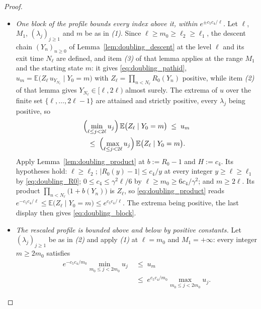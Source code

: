 \begin{proof}
\begin{itemize}
    \item \emph{One block of the profile bounds every index above it, within
    $e^{\pm c_5c_4/\ell}$.} Let $\ell$, $M_1$, $(\lambda_j)_{j\geq1}$ and $m$ be as in
    \emph{(1)}. Since $\ell\geq m_0\geq\ell_2\geq\ell_1$, the descent chain $(Y_n)_{n\geq0}$ of
    Lemma~\ref{lem:doubling_descent} at the level $\ell$ and its exit time $N_\ell$ are
    defined, and item \emph{(3)} of that lemma applies at the range $M_1$ and the starting
    state $m$: it gives \eqref{eq:doubling_pathid},
    $u_m=\mathbb E\bigl(Z_\ell\,u_{Y_{N_\ell}}\mid Y_0=m\bigr)$ with
    $Z_\ell=\prod_{n<N_\ell}R_0(Y_n)$ positive, while item \emph{(2)} of that lemma gives
    $Y_{N_\ell}\in[\ell,2\ell)$ almost surely. The extrema of $u$ over the finite set
    $\{\ell,\dots,2\ell-1\}$ are attained and strictly positive, every $\lambda_j$ being
    positive, so
    \begin{multline}
        \Bigl(\min_{\ell\leq j<2\ell}u_j\Bigr)\,\mathbb E\bigl(Z_\ell\mid Y_0=m\bigr)
        \;\leq\;u_m\\
        \;\leq\;\Bigl(\max_{\ell\leq j<2\ell}u_j\Bigr)\,
        \mathbb E\bigl(Z_\ell\mid Y_0=m\bigr).
    \end{multline}
    Apply Lemma~\ref{lem:doubling_product} at $b:=R_0-1$ and $H:=c_4$. Its hypotheses hold:
    $\ell\geq\ell_2$; $\bigl|R_0(y)-1\bigr|\leq c_4/y$ at every integer $y\geq\ell\geq\ell_1$
    by \eqref{eq:doubling_R0}; $0\leq c_4\leq\gamma^2\ell/6$ by
    $\ell\geq m_0\geq6c_4/\gamma^2$; and $m\geq2\ell$. Its product
    $\prod_{n<N_\ell}\bigl(1+b(Y_n)\bigr)$ is $Z_\ell$, so \eqref{eq:doubling_product} reads
    $e^{-c_5c_4/\ell}\leq\mathbb E\bigl(Z_\ell\mid Y_0=m\bigr)\leq e^{c_5c_4/\ell}$. The
    extrema being positive, the last display then gives \eqref{eq:doubling_block}.
    \item \emph{The rescaled profile is bounded above and below by positive constants.} Let
    $(\lambda_j)_{j\geq1}$ be as in \emph{(2)} and apply \emph{(1)} at $\ell=m_0$ and
    $M_1=+\infty$: every integer $m\geq2m_0$ satisfies
    \begin{equation}
    \begin{aligned}
        e^{-c_5c_4/m_0}\min_{m_0\leq j<2m_0}u_j\;&\leq\;u_m\\
        \;&\leq\;e^{c_5c_4/m_0}\max_{m_0\leq j<2m_0}u_j .
    \end{aligned}
    \end{equation}

\end{itemize}
\end{proof}
